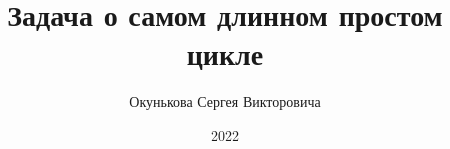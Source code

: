 \documentclass[spec, och, labwork]{../shiza}
\begin{document}
\chair{}

\title{Задача о самом длинном простом цикле}






\author{Окунькова Сергея Викторовича}








\date{2022}

\maketitle

\end{document}
